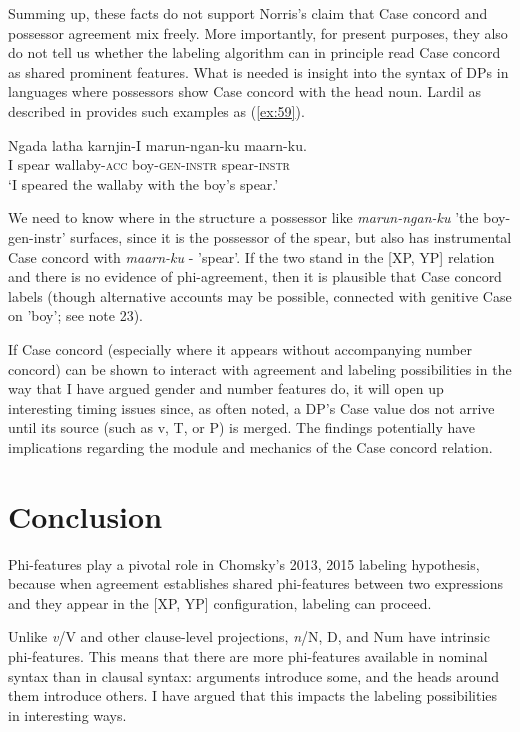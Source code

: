 \documentclass[output=paper
,modfonts
,nonflat]{langsci/langscibook}
\begin{document}
Summing up, these facts do not support Norris’s claim that Case concord and possessor agreement mix freely. More importantly, for present purposes, they also do not tell us whether the labeling algorithm can in principle {\textquotedbl}read{\textquotedbl} Case concord as shared prominent features. What is needed is insight into the syntax of DPs in languages where possessors show Case concord with the head noun. Lardil as described in \citet{Richards2007} provides such examples as (\ref{ex:59}).

\begin{exe}
\ex \label{ex:59}
\gll Ngada latha   karnjin-I       marun-ngan-ku   maarn-ku.\\
I    spear  wallaby-\textsc{acc} boy-\textsc{gen-instr}    spear-\textsc{instr}\\
\glt `I speared the wallaby with the boy's spear.'
\end{exe}
We need to know where in the structure a possessor like \textit{marun-ngan-ku} 'the boy-gen-instr' surfaces, since it is the possessor of the spear, but also has instrumental Case concord with \textit{maarn-ku} - 'spear'. If the two stand in the [XP, YP] relation and there is no evidence of phi-agreement, then it is plausible that Case concord labels (though alternative accounts may be possible, connected with genitive Case on 'boy'; see note 23).

If Case concord (especially where it appears without accompanying number concord) can be shown to interact with agreement and labeling possibilities in the way that I have argued gender and number features do, it will open up interesting timing issues since, as often noted, a DP’s Case value dos not arrive until its source (such as v, T, or P) is merged. The findings potentially have implications regarding the module and mechanics of the Case concord relation.  

\section{Conclusion} \label{sec:8}

Phi-features play a pivotal role in Chomsky's 2013, 2015 labeling hypothesis, because when agreement establishes shared phi-features between two expressions and they appear in the [XP, YP] configuration, labeling can proceed. 

Unlike \textit{v}/V and other clause-level projections, \textit{n}/N, D, and Num have intrinsic phi-features. This means that there are more phi-features available in nominal syntax than in clausal syntax: arguments introduce some, and the heads around them introduce others. I have argued that this impacts the labeling possibilities in interesting ways.
\end{document}
